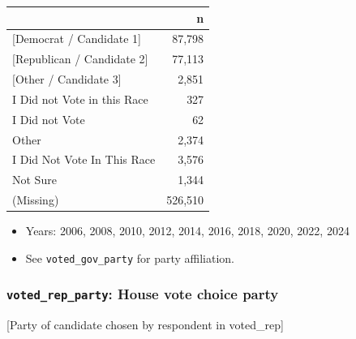 \documentclass[10pt,article,oneside]{memoir}
\begin{document}
\begin{table}[H]
\centering
\begin{tabular}[t]{lr}
\toprule
 & n\\
\midrule
{}{[Democrat / Candidate 1]} & 87,798\\
{}{[Republican / Candidate 2]} & 77,113\\
{}{[Other / Candidate 3]} & 2,851\\
I Did not Vote in this Race & 327\\
I Did not Vote & 62\\
Other & 2,374\\
I Did Not Vote In This Race & 3,576\\
Not Sure & 1,344\\
(Missing) & 526,510\\
\bottomrule
\end{tabular}
\end{table}

\begin{itemize}
\tightlist
\item
  Years: 2006, 2008, 2010, 2012, 2014, 2016, 2018, 2020, 2022, 2024
\item
  See \texttt{voted\_gov\_party} for party affiliation.
\end{itemize}

\subsubsection{\texorpdfstring{\texttt{voted\_rep\_party}: House vote
choice
party}{voted\_rep\_party: House vote choice party}}\label{voted_rep_party-house-vote-choice-party}

{[}Party of candidate chosen by respondent in voted\_rep{]}
\end{document}
